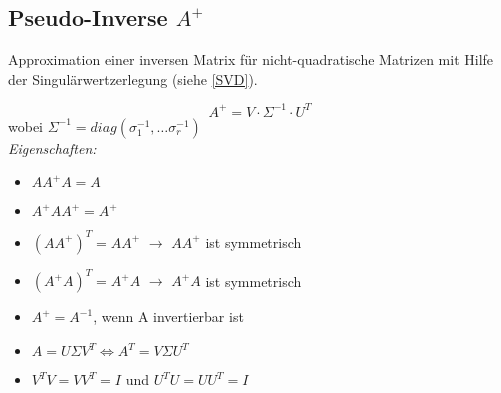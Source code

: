 \subsection{Pseudo-Inverse \(A^+\)}

Approximation einer inversen Matrix für nicht-quadratische Matrizen mit Hilfe der Singulärwertzerlegung (siehe \ref{SVD}).

\begin{equation*}
    A^+ = V \cdot \Sigma^{-1} \cdot U^T
\end{equation*}
wobei \(\Sigma^{-1}=diag(\sigma_1^{-1}, \hdots \sigma_r^{-1})\)\\

\textit{Eigenschaften:}
\begin{itemize}
    \item \(A  A^+  A = A\)
    \item \(A^+  A  A^+ = A^+\)
    \item \((A  A^+)^T = A  A^+\) \(\rightarrow\) \(A  A^+\) ist symmetrisch
    \item \((A^+  A)^T = A^+  A\) \(\rightarrow\) \(A^+  A\) ist symmetrisch
    \item \(A^+ = A^{-1}\), wenn A invertierbar ist
    \item \(A = U \Sigma V^T \Leftrightarrow A^T = V \Sigma U^T \)
    \item \(V^TV=VV^T=I\) und \(U^TU=UU^T=I\)
\end{itemize}